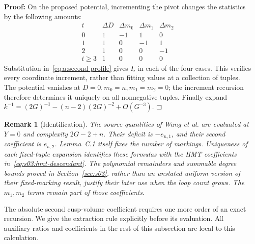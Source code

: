 \documentclass[a4paper,10pt]{article}
\numberwithin{equation}{section}
\theoremstyle{paperplain}
\theoremstyle{paperremark}
\newtheorem{rmk}{Remark}[section]
\theoremstyle{paperplain}
\newenvironment{prf}{\noindent \textbf{Proof: }}{\hfill $\mdlgwhtsquare$\par\addvspace{0.5\baselineskip}}
\begin{document}
\begin{prf}
On the proposed potential, incrementing the pivot changes the statistics
by the following amounts:
\[
\begin{array}{c|rrrr}
 t&\Delta D&\Delta m_0&\Delta m_1&\Delta m_2\\\hline
 0&1&-1&1&0\\
 1&1&0&-1&1\\
 2&1&0&0&-1\\
 t\geq3&1&0&0&0
\end{array}
\]
Substitution in~\eqref{eq:a:second-profile} gives $I_i$ in each of
the four cases. This verifies every coordinate increment, rather
than fitting values at a collection of tuples. The potential vanishes
at $D=0,m_0=n,m_1=m_2=0$; the increment recursion therefore determines
it uniquely on all nonnegative tuples. Finally expand
$k^{-1}=(2G)^{-1}-(n-2)(2G)^{-2}+O(G^{-3})$.
\end{prf}

\begin{rmk}[Identification]
The source quantities of Wang et al. are evaluated at $Y=0$ and
complexity $2G-2+n$. Their deficit is $-e_{n,1}$, and their second coefficient
is $e_{n,2}$. Lemma~C.1 itself fixes the number of markings. Uniqueness
of each fixed-tuple expansion identifies these formulas with the HMT
coefficients in~\eqref{eq:s03:hmt-descendant}. The polynomial remainders
and summable degree bounds proved in Section~\ref{sec:s03}, rather than
an unstated uniform version of their fixed-marking result, justify their later use when the
loop count grows. The $m_1,m_2$ terms remain part of those coefficients.
\end{rmk}

The absolute second cusp-volume coefficient requires one more order of
an exact recursion. We give the extraction rule explicitly before its
evaluation. All auxiliary ratios and coefficients in the rest of this
subsection are local to this calculation.
\end{document}
